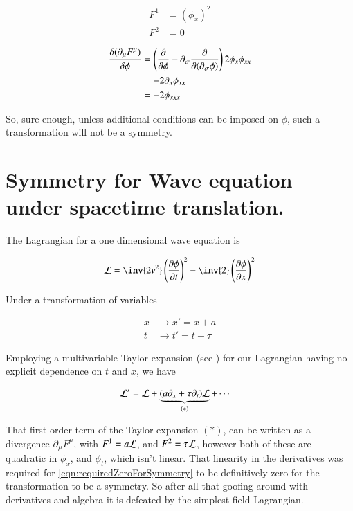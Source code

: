 \documentclass{article}
\begin{document}
\begin{align*}
F^1 &= (\phi_x)^2 \\
F^2 &= 0
\end{align*}

\begin{align*}
\frac{\delta (\partial_\mu F^\mu)}{\delta \phi} 
&=
\left(\frac{\partial {}}{\partial {\phi}} - \partial_\sigma \frac{\partial {}}{\partial {(\partial_\sigma \phi)}}\right) 2 \phi_x \phi_{xx} \\
&=
- 2 \partial_x \phi_{xx} \\
&=
- 2 \phi_{xxx} \\
\end{align*}

So, sure enough, unless additional conditions can be imposed on $\phi$, such a transformation
will not be a symmetry.

\section{ Symmetry for Wave equation under spacetime translation. }

The Lagrangian for a one dimensional wave equation is

\begin{align}\label{eqn:oneDimWave}
\LL = 
\inv{2 v^2} \left(\PD{t}{\phi}\right)^2 - \inv{2} \left(\PD{x}{\phi}\right)^2
\end{align}

Under a transformation of variables 

\begin{align*}
x &\rightarrow x' = x + a \\
t &\rightarrow t' = t + \tau 
\end{align*}

Employing a multivariable Taylor expansion
(see 
\cite{PJmultiTaylors}
)
for our Lagrangian having no explicit dependence on $t$ and $x$, we have

\begin{align*}
\mathcal{L}' &= \mathcal{L} + \underbrace{(a \partial_x + \tau \partial_t)\mathcal{L}}_{(*)} + \cdots
\end{align*}

That first order term of the Taylor expansion $(*)$, 
can be written as a divergence $\partial_\mu F^\mu$, with $F^1 = a \mathcal{L}$, and $F^2 = \tau\mathcal{L}$, however
both of these are quadratic in $\phi_x$, and $\phi_t$, which isn't linear.
That linearity in the derivatives was required for \ref{eqn:requiredZeroForSymmetry} to be 
definitively zero for the transformation to be a symmetry.  So after all that goofing around
with derivatives and algebra it is defeated by the
simplest field Lagrangian.
\end{document}
